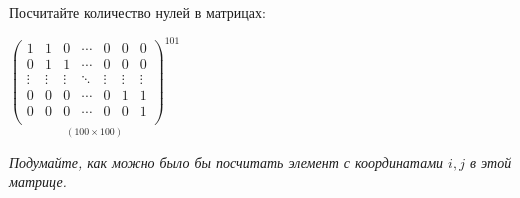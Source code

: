 	\begin{problem}{
		Посчитайте количество нулей в матрицах: \\
			\centerline{
				$\underset{(100 \times 100)}{\begin{pmatrix}
					1 & 1 & 0 & \cdots & 0 & 0 & 0 \\
					0 & 1 & 1 & \cdots & 0 & 0 & 0 \\
					\vdots & \vdots & \vdots  & \ddots & \vdots & \vdots & \vdots \\
					0 & 0 & 0 & \cdots & 0 & 1 & 1 \\
					0 & 0 & 0 & \cdots & 0 & 0 & 1 \\
				\end{pmatrix}^{101}}$
			}
		\textit{Подумайте, как можно было бы посчитать элемент с координатами $i, j$ в этой матрице.}
		
	}\end{problem}


